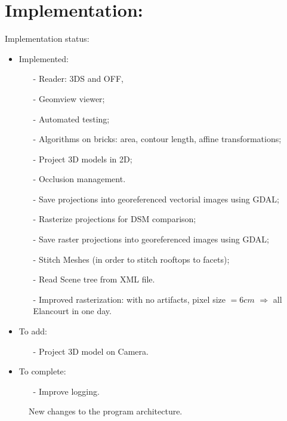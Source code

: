\documentclass[a4paper, 11pt]{article}
\begin{document}
	\section*{Implementation:}
	Implementation status:
	\begin{itemize}
		\item Implemented:
			\begin{itemize}
				\item[-] Reader: 3DS and OFF,
				\item[-] Geomview viewer;
				\item[-] Automated testing;
				\item[-] Algorithms on bricks: area, contour length, affine transformations;
				\item[-] Project 3D models in 2D;
				\item[-] Occlusion management.
				\item[-] Save projections into georeferenced vectorial images using GDAL;
				\item[-] Rasterize projections for DSM comparison;
				\item[-] Save raster projections into georeferenced images using GDAL;
				\item[-] Stitch Meshes (in order to stitch rooftops to facets);
				\item[-] Read Scene tree from XML file.
				\item[-] Improved rasterization: with no artifacts, pixel size $= 6 cm $ $\Rightarrow$ all  Elancourt in one day.
			\end{itemize}
		\item To add:
			\begin{itemize}
				\item[-] Project 3D model on Camera.
		\end{itemize}
		\item To complete:
			\begin{itemize}
				\item[-] Improve logging.
			\end{itemize}
	\end{itemize}

	\begin{figure}[H]
		\caption{\label{diag::class} New changes to the program architecture.}
	\end{figure}
\end{document}
